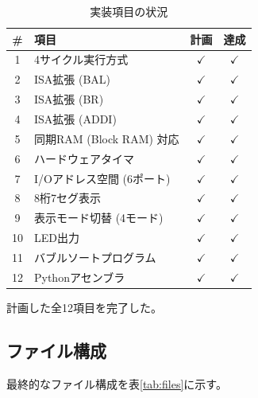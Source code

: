 \documentclass[a4paper,11pt]{ltjsarticle}
\begin{document}
\begin{table}[h]
\centering
\caption{実装項目の状況}
\begin{tabular}{clcc}
\toprule
\# & 項目 & 計画 & 達成 \\
\midrule
1 & 4サイクル実行方式         & $\checkmark$ & $\checkmark$ \\
2 & ISA拡張 (BAL)             & $\checkmark$ & $\checkmark$ \\
3 & ISA拡張 (BR)              & $\checkmark$ & $\checkmark$ \\
4 & ISA拡張 (ADDI)            & $\checkmark$ & $\checkmark$ \\
5 & 同期RAM (Block RAM) 対応  & $\checkmark$ & $\checkmark$ \\
6 & ハードウェアタイマ         & $\checkmark$ & $\checkmark$ \\
7 & I/Oアドレス空間 (6ポート) & $\checkmark$ & $\checkmark$ \\
8 & 8桁7セグ表示              & $\checkmark$ & $\checkmark$ \\
9 & 表示モード切替 (4モード)  & $\checkmark$ & $\checkmark$ \\
10& LED出力                    & $\checkmark$ & $\checkmark$ \\
11& バブルソートプログラム     & $\checkmark$ & $\checkmark$ \\
12& Pythonアセンブラ           & $\checkmark$ & $\checkmark$ \\
\bottomrule
\end{tabular}
\end{table}

計画した全12項目を完了した。

\subsection{ファイル構成}

最終的なファイル構成を表\ref{tab:files}に示す。
\end{document}
